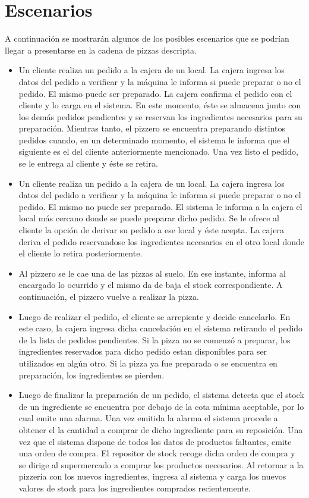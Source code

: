 \documentclass[a4paper,11pt] {article}
\begin{document}
\section*{Escenarios}
A continuaci\'on se mostrar\'an algunos de los posibles escenarios que se podr\'ian llegar a presentarse en la cadena de pizzas descripta. 
\begin{itemize}
	\item Un cliente realiza un pedido a la cajera de un local. La cajera ingresa los datos del pedido a verificar y la m\'aquina le informa si puede preparar o no el pedido. El mismo puede ser preparado. La cajera confirma el pedido con el cliente y lo carga en el sistema. En este momento, \'este se almacena junto con los dem\'as pedidos pendientes y se reservan los ingredientes necesarios para su preparaci\'on. Mientras tanto, el pizzero se encuentra preparando distintos pedidos cuando, en un determinado momento, el sistema le informa que el siguiente es el del cliente anteriormente mencionado. Una vez listo el pedido, se le entrega al cliente y \'este se retira.
	\item Un cliente realiza un pedido a la cajera de un local. La cajera ingresa los datos del pedido a verificar y la m\'aquina le informa si puede preparar o no el pedido. El mismo no puede ser preparado. El sistema le informa a la cajera el local m\'as cercano donde se puede preparar dicho pedido. Se le ofrece al cliente la opci\'on de derivar su pedido a ese local y \'este acepta. La cajera deriva el pedido reservandose los ingredientes necesarios en el otro local donde el cliente lo retira posteriormente.
	\item Al pizzero se le cae una de las pizzas al suelo. En ese instante, informa al encargado lo ocurrido y el mismo da de baja el stock correspondiente. A continuaci\'on, el pizzero vuelve a realizar la pizza.
    \item Luego de realizar el pedido, el cliente se arrepiente y decide cancelarlo. En este caso, la cajera ingresa dicha cancelaci\'on en el sistema retirando el pedido de la lista de pedidos pendientes. Si la pizza no se comenz\'o a preparar, los ingredientes reservados para dicho pedido estan disponibles para ser utilizados en alg\'un otro. Si la pizza ya fue preparada o se encuentra en preparaci\'on, los ingredientes se pierden.
    \item Luego de finalizar la preparaci\'on de un pedido, el sistema detecta que el stock de un ingrediente se encuentra por debajo de la cota m\'inima aceptable, por lo cual emite una alarma. Una vez emitida la alarma el sistema procede a obtener el la cantidad a comprar de dicho ingrediente para su reposici\'on. Una vez que el sistema dispone de todos los datos de productos faltantes, emite una orden de compra. El repositor de stock recoge dicha orden de compra y se dirige al supermercado a comprar los productos necesarios. Al retornar a la pizzer\'ia con los nuevos ingredientes, ingresa al sistema y carga los nuevos valores de stock para los ingredientes comprados recientemente.

\end{itemize}
\end{document}
